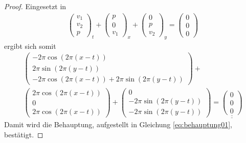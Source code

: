 \begin{proof}
Eingesetzt in
\begin{align}
\begin{pmatrix}
v_1\\
v_2\\
p
\end{pmatrix}_t
+
\begin{pmatrix}
p\\
0\\
v_1
\end{pmatrix}_x
+
\begin{pmatrix}
0\\
p\\
v_2
\end{pmatrix}_y
=
\begin{pmatrix}
0\\
0\\
0
\end{pmatrix}
\end{align}
ergibt sich somit
\begin{align}
\begin{pmatrix}
-2\pi \cos(2\pi(x-t))\\
2\pi \sin(2\pi(y-t))\\
-2\pi \cos(2\pi(x-t))+2\pi \sin(2\pi(y-t))
\end{pmatrix}
+ \\[0.4cm]
\begin{pmatrix}
2\pi \cos(2\pi(x-t))\\
0\\
2\pi \cos(2\pi(x-t))
\end{pmatrix}
+
\begin{pmatrix}
0\\
-2\pi \sin(2\pi(y-t))\\
-2\pi \sin(2\pi(y-t))
\end{pmatrix}
=
\underline{\underline{\begin{pmatrix}
0\\
0\\
0
\end{pmatrix}}}
\end{align}
Damit wird die Behauptung, aufgestellt in Gleichung \eqref{eq:behauptung01}, bestätigt.
\end{proof}
